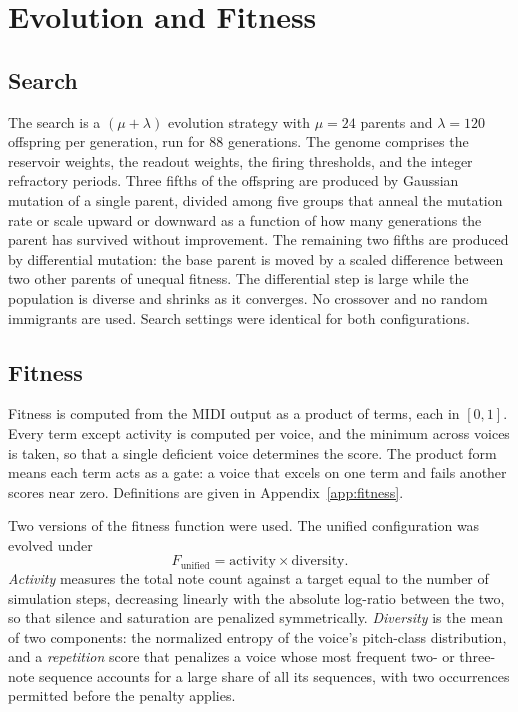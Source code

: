 \documentclass[conference]{IEEEtran}
\begin{document}
\section{Evolution and Fitness}

\subsection{Search}

The search is a $(\mu+\lambda)$ evolution strategy with $\mu = 24$ parents and $\lambda = 120$ offspring per generation, run for 88 generations. The genome comprises the reservoir weights, the readout weights, the firing thresholds, and the integer refractory periods. Three fifths of the offspring are produced by Gaussian mutation of a single parent, divided among five groups that anneal the mutation rate or scale upward or downward as a function of how many generations the parent has survived without improvement. The remaining two fifths are produced by differential mutation: the base parent is moved by a scaled difference between two other parents of unequal fitness. The differential step is large while the population is diverse and shrinks as it converges. No crossover and no random immigrants are used. Search settings were identical for both configurations.

\subsection{Fitness}

Fitness is computed from the MIDI output as a product of terms, each in $[0, 1]$. Every term except activity is computed per voice, and the minimum across voices is taken, so that a single deficient voice determines the score. The product form means each term acts as a gate: a voice that excels on one term and fails another scores near zero. Definitions are given in Appendix~\ref{app:fitness}.

Two versions of the fitness function were used. The unified configuration was evolved under
\begin{equation}
F_{\text{unified}} = \text{activity} \times \text{diversity}.
\end{equation}
\emph{Activity} measures the total note count against a target equal to the number of simulation steps, decreasing linearly with the absolute log-ratio between the two, so that silence and saturation are penalized symmetrically. \emph{Diversity} is the mean of two components: the normalized entropy of the voice's pitch-class distribution, and a \emph{repetition} score that penalizes a voice whose most frequent two- or three-note sequence accounts for a large share of all its sequences, with two occurrences permitted before the penalty applies.
\end{document}
